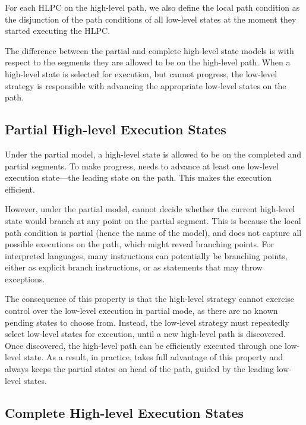 For each HLPC on the high-level path, we also define the local path condition as the disjunction of the path conditions of all low-level states at the moment they started executing the HLPC.

The difference between the partial and complete high-level state models is with respect to the segments they are allowed to be on the high-level path.
%
When a high-level state is selected for execution, but cannot progress, the low-level strategy is responsible with advancing the appropriate low-level states on the path.


\subsection{Partial High-level Execution States}

Under the partial model, a high-level state is allowed to be on the completed and partial segments.
%
To make progress, \chef needs to advance at least one low-level execution state---the leading state on the path.  This makes the execution efficient.

However, under the partial model, \chef cannot decide whether the current high-level state would branch at any point on the partial segment.
%
This is because the local path condition is partial (hence the name of the model), and does not capture all possible executions on the path, which might reveal branching points.  For interpreted languages, many instructions can potentially be branching points, either as explicit branch instructions, or as statements that may throw exceptions.  

The consequence of this property is that the high-level strategy cannot exercise control over the low-level execution in partial mode, as there are no known pending states to choose from.
%
Instead, the low-level strategy must repeatedly select low-level states for execution, until a new high-level path is discovered.
%
Once discovered, the high-level path can be efficiently executed through one low-level state.
%
As a result, in practice, \chef takes full advantage of this property and always keeps the partial states on head of the path, guided by the leading low-level states.

\subsection{Complete High-level Execution States}

